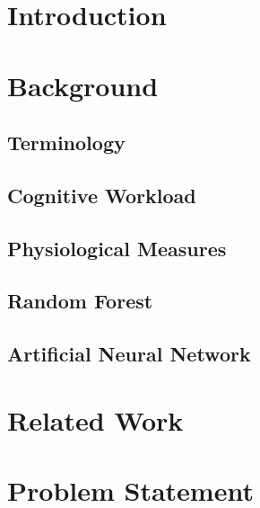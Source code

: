 \documentclass[11pt]{article}
\begin{document}
\section{Introduction}

\section{Background}

	\subsection{Terminology}
	
	\subsection{Cognitive Workload}

	\subsection{Physiological Measures}
	
	\subsection{Random Forest}
	
	\subsection{Artificial Neural Network}

\section{Related Work}


\section{Problem Statement}
\end{document}
